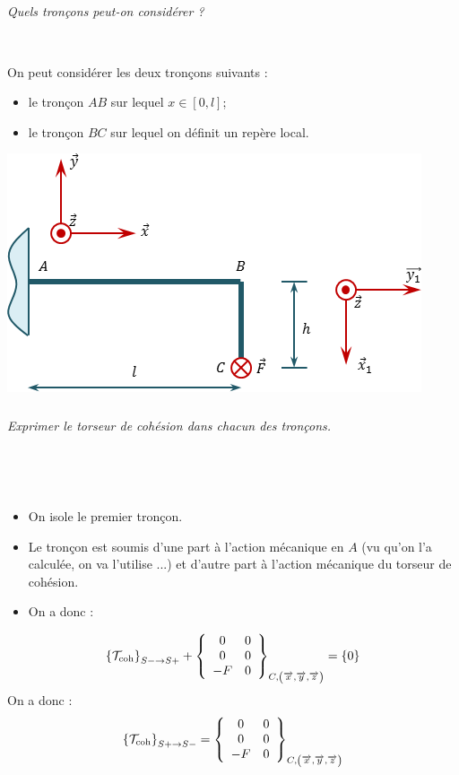 \documentclass[10pt,fleqn]{article} %
\begin{document}
\begin{multicols}{1}
\subparagraph{}
\textit{Quels tronçons peut-on considérer ?}
\ifprof
\begin{corrige}~\\
\begin{minipage}[c]{.45\linewidth}
On peut considérer les deux tronçons suivants :
\begin{itemize}[label=,font=\color{ocre}] 
\item le tronçon $AB$ sur lequel $x\in[0,l]$;
\item le tronçon $BC$ sur lequel on définit un repère local.
\end{itemize}
\end{minipage} \hfill
\begin{minipage}[c]{.45\linewidth}
\begin{center}
\includegraphics[width=\linewidth]{images/exo_02_corr_01}
\end{center}
\end{minipage}
\end{corrige}
\else 
\fi

\subparagraph{}
\textit{Exprimer le torseur de cohésion dans chacun des tronçons.}

\ifprof
~\\
\begin{corrige} ~\\

\begin{itemize}[label=,font=\color{ocre}] 
\item On isole le premier tronçon.
\item Le tronçon est soumis d'une part à l'action mécanique en $A$ (vu qu'on l'a calculée, on va l'utilise ...) et d'autre part à l'action mécanique du torseur de cohésion.
\item On a donc :
\end{itemize}
$$
\torseurscoh_{S-\rightarrow S+} + \torseurcol{0}{0}{-F}{0}{0}{0}{C,\left( \vect{x},\vect{y},\vect{z} \right)} = \{0\}
$$
On a donc :
$$
\torseurscoh_{S+\rightarrow S-}
=\torseurcol{0}{0}{-F}{0}{0}{0}{C,\left( \vect{x},\vect{y},\vect{z} \right)}
$$


\end{corrige}
\end{multicols}
\end{document}
